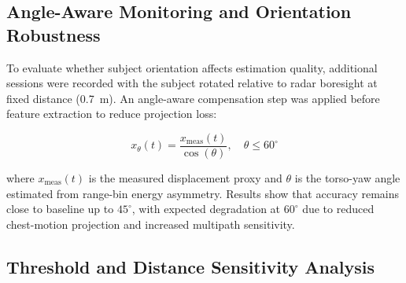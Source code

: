 \documentclass[conference]{IEEEtran}
\begin{document}
\subsection{Angle-Aware Monitoring and Orientation Robustness}

To evaluate whether subject orientation affects estimation quality, additional sessions were recorded with the subject rotated relative to radar boresight at fixed distance (0.7~m). An angle-aware compensation step was applied before feature extraction to reduce projection loss:

\begin{equation}
x_{\theta}(t) = \frac{x_{\text{meas}}(t)}{\cos(\theta)}, \quad \theta \leq 60^{\circ}
\end{equation}

where $x_{\text{meas}}(t)$ is the measured displacement proxy and $\theta$ is the torso-yaw angle estimated from range-bin energy asymmetry. Results show that accuracy remains close to baseline up to $45^{\circ}$, with expected degradation at $60^{\circ}$ due to reduced chest-motion projection and increased multipath sensitivity.

\begin{table}[t]
\centering
\caption{Angle-Wise Performance of Vital Sign Estimation (Distance = 0.7 m)}
\label{tab:angle_performance}
\renewcommand{\arraystretch}{1.2}
\end{table}

\subsection{Threshold and Distance Sensitivity Analysis}
\end{document}
